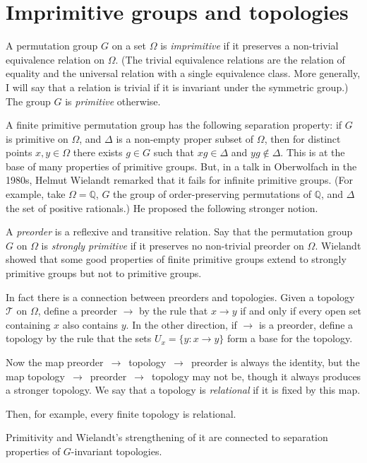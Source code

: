 \documentclass[12pt]{article}
\begin{document}
\section{Imprimitive groups and topologies}

A permutation group $G$ on a set $\Omega$ is \emph{imprimitive} if it 
preserves a non-trivial equivalence relation on $\Omega$. (The trivial
equivalence relations are the relation of equality and the universal relation
with a single equivalence class. More generally, I will say that a relation
is trivial if it is invariant under the symmetric group.) The group $G$ is
\emph{primitive} otherwise.

A finite primitive permutation group has the following separation property:
if $G$ is primitive on $\Omega$, and $\Delta$ is a non-empty proper subset of
$\Omega$, then for distinct points $x,y\in\Omega$ there exists
$g\in G$ such that $xg\in\Delta$ and $yg\notin\Delta$. This is at
the base of many properties of primitive groups. But, in a talk in Oberwolfach
in the 1980s, Helmut Wielandt remarked that it fails for infinite primitive
groups. (For example, take $\Omega=\mathbb{Q}$, $G$ the group of
order-preserving permutations of $\mathbb{Q}$, and $\Delta$ the set of
positive rationals.) He proposed the following stronger notion.

A \emph{preorder} is a reflexive and transitive relation. Say that the
permutation group $G$ on $\Omega$ is \emph{strongly primitive} if it preserves
no non-trivial preorder on $\Omega$. Wielandt showed that some good properties
of finite primitive groups extend to strongly primitive groups but not to
primitive groups.

In fact there is a connection between preorders and topologies. Given a
topology $\mathcal{T}$ on $\Omega$, define a preorder $\to$ by the rule
that $x\to y$ if and only if every open set containing $x$ also contains $y$.
In the other direction, if $\to$ is a preorder, define a topology by the
rule that the sets $U_x=\{y:x\to y\}$ form a base for the topology.

Now the map preorder~$\to$~topology~$\to$~preorder is always the identity,
but the map topology~$\to$~preorder~$\to$~topology may not be, though it
always produces a stronger topology. We say that a topology is \emph{relational}
if it is fixed by this map.

Then, for example, every finite topology is relational.

Primitivity and Wielandt's strengthening of it are connected to separation
properties of $G$-invariant topologies.
\end{document}
